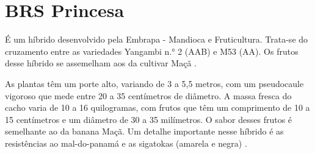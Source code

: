 \section{BRS Princesa}
É um híbrido desenvolvido pela Embrapa - Mandioca e Fruticultura. Trata-se do cruzamento entre as variedades Yangambi n.° 2 (AAB) e M53 (AA). Os frutos desse híbrido se assemelham aos da cultivar Maçã \cite{cultivodebananeira}. 

As plantas têm um porte alto, variando de 3 a 5,5 metros, com um pseudocaule vigoroso que mede entre 20 a 35 centímetros de diâmetro. A massa fresca do cacho varia de 10 a 16 quilogramas, com frutos que têm um comprimento de 10 a 15 centímetros e um diâmetro de 30 a 35 milímetros. O sabor desses frutos é semelhante ao da banana Maçã. Um detalhe importante nesse híbrido é as resistências ao mal-do-panamá e as sigatokas (amarela e negra) \cite{cultivodebananeira}.

